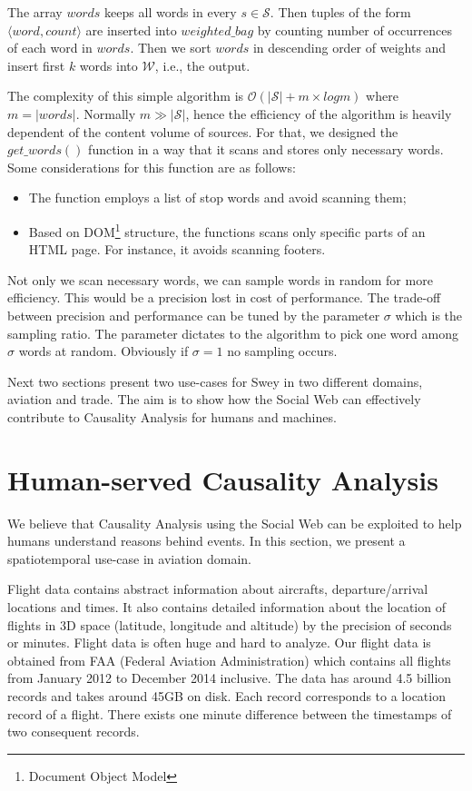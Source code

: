 \documentclass[conference]{IEEEtran}
\begin{document}
The array $words$ keeps all words in every $s \in {\mathcal S}$. Then tuples of the form $\langle word, count\rangle$ are inserted into ${\mathit weighted\_bag}$ by counting number of occurrences of each word in $words$. Then we sort $words$ in descending order of weights and insert first $k$ words into ${\mathcal W}$, i.e., the output.

The complexity of this simple algorithm is ${\mathcal O}(|{\mathcal S}| + m \times log m)$ where $m = |words|$. Normally $m \gg |{\mathcal S}|$, hence the efficiency of the algorithm is heavily dependent of the content volume of sources. For that, we designed the ${\mathit get\_words}()$ function in a way that it scans and stores only necessary words. Some considerations for this function are as follows:

\begin{itemize}
\item The function employs a list of stop words and avoid scanning them;
\item Based on DOM\footnote{Document Object Model} structure, the functions scans only specific parts of an HTML page. For instance, it avoids scanning footers.
\end{itemize}

Not only we scan necessary words, we can sample words in random for more efficiency. This would be a precision lost in cost of performance. The trade-off between precision and performance can be tuned by the parameter $\sigma$ which is the sampling ratio. The parameter dictates to the algorithm to pick one word among $\sigma$ words at random. Obviously if $\sigma = 1$ no sampling occurs.

Next two sections present two use-cases for {\sc Swey} in two different domains, aviation and trade. The aim is to show how the Social Web can effectively contribute to Causality Analysis for humans and machines.

\section{Human-served Causality Analysis}
\label{sec:human}
We believe that Causality Analysis using the Social Web can be exploited to help humans understand reasons behind events. In this section, we present a spatiotemporal use-case in aviation domain.

Flight data contains abstract information about aircrafts, departure/arrival locations and times. It also contains detailed information about the location of flights in 3D space (latitude, longitude and altitude) by the precision of seconds or minutes. Flight data is often huge and hard to analyze. Our flight data is obtained from FAA (Federal Aviation Administration) which contains all flights from January 2012 to December 2014 inclusive. The data has around 4.5 billion records and takes around 45GB on disk. Each record corresponds to a location record of a flight. There exists one minute difference between the timestamps of two consequent records.
\end{document}
